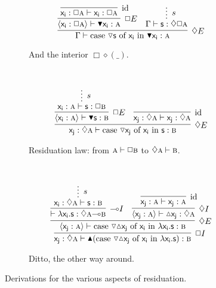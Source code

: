 \begin{figure}
\begin{subfigure}{0.4\textwidth}
		\label{subfigure:modal_properties:closure}
	\end{subfigure}%
	\begin{subfigure}{0.5\textwidth}
		\[
		\infer[\diamond E]{\Gamma \vdash \cterm{case \term{\diaelim{s}} of \term{x_i } in \term{\boxelim x_i }}: \prop{A}}{
						\infer[\Box E]{\bracket{\term{x_i }: \Box \prop{A}}\vdash \boxelim\term{x_i }:\prop{A}}{
							\infer[\Ax]{\term{x_i }: \Box\prop{A} \vdash \term{x_i }: \Box\prop{A}}{}
						}
						&
						\infer*[s]{\Gamma\vdash \term{s}: \diamond \Box \prop{A}}{}
				}
		\]
		\caption{And the interior $\Box\diamond(\_)$.}
		\label{subfigure:modal_properties:interior}
	\end{subfigure}\\[\midsep]
	\begin{subfigure}{1\textwidth}
		\[
			\infer[\diamond E]{\term{x_j}: \diamond \prop{A} \vdash \caseof{\diaelim x_j}{x_i }{s}:\prop{B}}{
				\infer[\Box E]{\bracket{\term{x_i }: \prop{A}} \vdash \boxelim\term{s}: \prop{B}}{
					\infer*[s]{\term{x_i }: \prop{A} \vdash \term{s}: \Box\prop{B}}{}
				}
				&
				\infer[\Ax]{\term{x_j}: \diamond \prop{A} \vdash \term{x_j}: \diamond \prop{A}}{}
			}
		\]
	\caption{Residuation law: from $\smallprop{A} \vdash \Box\smallprop{B}$ to $\diamond\smallprop{A} \vdash \smallprop{B}$.}
	\label{subfigure:modal_properties:residuation:1}	
	\end{subfigure}\\[\midsep]
	\begin{subfigure}{1\textwidth}
		\[
			\infer[\Box I]{\term{x_j}: \diamond \prop{A} \vdash \boxintro(\caseof{\diaelim \diaintro x_j}{x_i }{\lambda x_i .s}): \prop{B}}{
				\infer[\diamond E]{\bracket{\term{x_j}: \prop{A}} \vdash \caseof{\diaelim \diaintro x_j}{x_i }{\lambda x_i .s}: \prop{B}}{
					\infer[\li I]{\vdash \term{\lambda x_i .s}: \diamond\prop{A} \li \prop{B}}{
						\infer*[s]{\term{x_i }: \diamond\prop{A} \vdash \term{s}: \prop{B}}{}
					}
					&
					\infer[\diamond I]{\bracket{\term{x_j}: \prop{A}} \vdash \term{\diaintro x_j}: \diamond \prop{A}}{
						\infer[\Ax]{\term{x_j}: \prop{A} \vdash \term{x_j}: \prop{A}}{}
					}
				}
			}
		\]
		\caption{Ditto, the other way around.}
		\label{subfigure:modal_properties:residuation:2}	
	\end{subfigure}
	\caption{Derivations for the various aspects of residuation.}
	\label{figure:modal_properties:residuation}
\end{figure}

